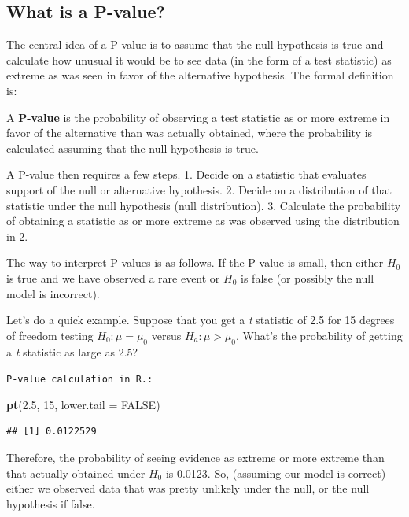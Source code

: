 \documentclass[]{article}
\newenvironment{Shaded}{\begin{snugshade}}{\end{snugshade}}
\newcommand{\KeywordTok}[1]{\textcolor[rgb]{0.13,0.29,0.53}{\textbf{{#1}}}}
\newcommand{\DataTypeTok}[1]{\textcolor[rgb]{0.13,0.29,0.53}{{#1}}}
\newcommand{\DecValTok}[1]{\textcolor[rgb]{0.00,0.00,0.81}{{#1}}}
\newcommand{\FloatTok}[1]{\textcolor[rgb]{0.00,0.00,0.81}{{#1}}}
\newcommand{\OtherTok}[1]{\textcolor[rgb]{0.56,0.35,0.01}{{#1}}}
\newcommand{\NormalTok}[1]{{#1}}
\begin{document}
\subsection{What is a P-value?}\label{what-is-a-p-value}

The central idea of a P-value is to assume that the null hypothesis is
true and calculate how unusual it would be to see data (in the form of a
test statistic) as extreme as was seen in favor of the alternative
hypothesis. The formal definition is:

A \textbf{P-value} is the probability of observing a test statistic as
or more extreme in favor of the alternative than was actually obtained,
where the probability is calculated assuming that the null hypothesis is
true.

A P-value then requires a few steps. 1. Decide on a statistic that
evaluates support of the null or alternative hypothesis. 2. Decide on a
distribution of that statistic under the null hypothesis (null
distribution). 3. Calculate the probability of obtaining a statistic as
or more extreme as was observed using the distribution in 2.

The way to interpret P-values is as follows. If the P-value is small,
then either $H_0$ is true and we have observed a rare event or $H_0$ is
false (or possibly the null model is incorrect).

Let's do a quick example. Suppose that you get a \emph{t} statistic of
2.5 for 15 degrees of freedom testing $H_0:\mu = \mu_0$ versus
$H_a : \mu > \mu_0$. What's the probability of getting a \emph{t}
statistic as large as 2.5?

\vspace{1pc}

\verb;P-value calculation in R.:;

\begin{Shaded}
\begin{Highlighting}[]
\KeywordTok{pt}\NormalTok{(}\FloatTok{2.5}\NormalTok{, }\DecValTok{15}\NormalTok{, }\DataTypeTok{lower.tail =} \OtherTok{FALSE}\NormalTok{)}
\end{Highlighting}
\end{Shaded}

\begin{verbatim}
## [1] 0.0122529
\end{verbatim}

Therefore, the probability of seeing evidence as extreme or more extreme
than that actually obtained under $H_0$ is 0.0123. So, (assuming our
model is correct) either we observed data that was pretty unlikely under
the null, or the null hypothesis if false.
\end{document}
